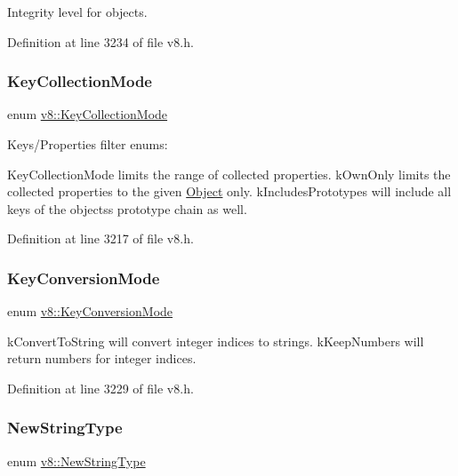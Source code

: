 Integrity level for objects. 

Definition at line 3234 of file v8.\+h.

\mbox{\label{namespacev8_a0cee20f5c7f0d59d0835af8e537388dc}} 
\subsubsection{\texorpdfstring{Key\+Collection\+Mode}{KeyCollectionMode}}
{\footnotesize\ttfamily enum \mbox{\hyperlink{namespacev8_a0cee20f5c7f0d59d0835af8e537388dc}{v8\+::\+Key\+Collection\+Mode}}\hspace{0.3cm}{\ttfamily [strong]}}

Keys/\+Properties filter enums\+:

Key\+Collection\+Mode limits the range of collected properties. k\+Own\+Only limits the collected properties to the given \mbox{\hyperlink{classv8_1_1Object}{Object}} only. k\+Includes\+Prototypes will include all keys of the objects\textquotesingle{}s prototype chain as well. 

Definition at line 3217 of file v8.\+h.

\mbox{\label{namespacev8_aa65aeff871614520d8033dead4b34e38}} 
\subsubsection{\texorpdfstring{Key\+Conversion\+Mode}{KeyConversionMode}}
{\footnotesize\ttfamily enum \mbox{\hyperlink{namespacev8_aa65aeff871614520d8033dead4b34e38}{v8\+::\+Key\+Conversion\+Mode}}\hspace{0.3cm}{\ttfamily [strong]}}

k\+Convert\+To\+String will convert integer indices to strings. k\+Keep\+Numbers will return numbers for integer indices. 

Definition at line 3229 of file v8.\+h.

\mbox{\label{namespacev8_ac9163ab12fb3b2a95907a3a0367c6095}} 
\subsubsection{\texorpdfstring{New\+String\+Type}{NewStringType}}
{\footnotesize\ttfamily enum \mbox{\hyperlink{namespacev8_ac9163ab12fb3b2a95907a3a0367c6095}{v8\+::\+New\+String\+Type}}\hspace{0.3cm}{\ttfamily [strong]}}

